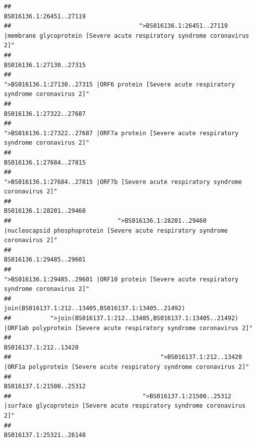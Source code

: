\documentclass[
]{article}
\begin{document}
\begin{verbatim}
##                                                                                                                BS016136.1:26451..27119 
##                                    ">BS016136.1:26451..27119 |membrane glycoprotein [Severe acute respiratory syndrome coronavirus 2]" 
##                                                                                                                BS016136.1:27130..27315 
##                                             ">BS016136.1:27130..27315 |ORF6 protein [Severe acute respiratory syndrome coronavirus 2]" 
##                                                                                                                BS016136.1:27322..27687 
##                                            ">BS016136.1:27322..27687 |ORF7a protein [Severe acute respiratory syndrome coronavirus 2]" 
##                                                                                                                BS016136.1:27684..27815 
##                                                    ">BS016136.1:27684..27815 |ORF7b [Severe acute respiratory syndrome coronavirus 2]" 
##                                                                                                                BS016136.1:28201..29460 
##                              ">BS016136.1:28201..29460 |nucleocapsid phosphoprotein [Severe acute respiratory syndrome coronavirus 2]" 
##                                                                                                                BS016136.1:29485..29601 
##                                            ">BS016136.1:29485..29601 |ORF10 protein [Severe acute respiratory syndrome coronavirus 2]" 
##                                                                                    join(BS016137.1:212..13405,BS016137.1:13405..21492) 
##           ">join(BS016137.1:212..13405,BS016137.1:13405..21492) |ORF1ab polyprotein [Severe acute respiratory syndrome coronavirus 2]" 
##                                                                                                                  BS016137.1:212..13420 
##                                          ">BS016137.1:212..13420 |ORF1a polyprotein [Severe acute respiratory syndrome coronavirus 2]" 
##                                                                                                                BS016137.1:21500..25312 
##                                     ">BS016137.1:21500..25312 |surface glycoprotein [Severe acute respiratory syndrome coronavirus 2]" 
##                                                                                                                BS016137.1:25321..26148 

\end{verbatim}
\end{document}
